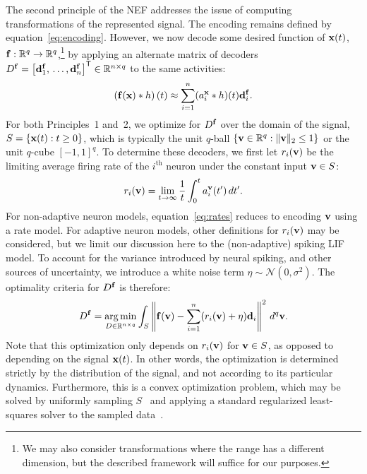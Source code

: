 The second principle of the NEF addresses the issue of computing transformations of the represented signal.
The encoding remains defined by equation~\ref{eq:encoding}.
However, we now decode some desired function of $\mathbf{x}(t)$, $\mathbf{f} : \mathbb{R}^q \rightarrow \mathbb{R}^q$,\footnote{
We may also consider transformations where the range has a different dimension, but the described framework will suffice for our purposes.}
by applying an alternate matrix of decoders $D^{\mathbf{f}} = {\left[ \mathbf{d}^{\mathbf{f}}_1\text{,}\, \ldots\text{,}\, \mathbf{d}^{\mathbf{f}}_n \right]}^\mathsf{T} \in \mathbb{R}^{n \times q}$ to the same activities:
\begin{equation} \label{eq:trans-decode}
\left( \mathbf{f}(\mathbf{x}) \ast h \right)(t) \approx \sum_{i=1}^n (a_i^{\mathbf{x}} \ast h)(t) \mathbf{d}^{\mathbf{f}}_i \text{.}
\end{equation}
For both Principles~1 and~2, we optimize for $D^{\mathbf{f}}$ over the domain of the signal, $S = \{\mathbf{x}(t) : t \ge 0\}$, which is typically the unit $q$-ball $\{ \mathbf{v} \in \mathbb{R}^q : \|\mathbf{v}\|_2 \le 1\}$ or the unit $q$-cube $[-1\text{,}\, 1]^q$.
To determine these decoders, we first let $r_i(\mathbf{v})$ be the limiting average firing rate of the $i^{\text{th}}$ neuron under the constant input $\mathbf{v} \in S$:
\begin{equation} \label{eq:rates}
r_i(\mathbf{v}) = \lim_{t \rightarrow \infty} \frac{1}{t} \int_{0}^t a_i^{\mathbf{v}}(t') \, dt' \text{.}
\end{equation}
For non-adaptive neuron models, equation~\ref{eq:rates} reduces to encoding $\mathbf{v}$ using a rate model.
For adaptive neuron models, other definitions for $r_i(\mathbf{v})$ may be considered, but we limit our discussion here to the (non-adaptive) spiking LIF model.
To account for the variance introduced by neural spiking, and other sources of uncertainty, we introduce a white noise term $\eta \sim \mathcal{N}(0, \sigma^2)$.
The optimality criteria for $D^{\mathbf{f}}$ is therefore:
\begin{equation} \label{eq:decoder_solution}
D^{\mathbf{f}} = \operatorname*{arg\,min}_{D \in \mathbb{R}^{n \times q}} \int_{S} \left\| \mathbf{f}(\mathbf{v}) - \sum_{i=1}^n (r_i(\mathbf{v}) + \eta) \mathbf{d}_i \right\|^2 \, d^q\mathbf{v} \text{.}
\end{equation}
Note that this optimization only depends on $r_i(\mathbf{v})$ for $\mathbf{v} \in S$, as opposed to depending on the signal $\mathbf{x}(t)$.
In other words, the optimization is determined strictly by the distribution of the signal, and not according to its particular dynamics.
Furthermore, this is a convex optimization problem, which may be solved by uniformly sampling $S$~\citep{voelker2017} and applying a standard regularized least-squares solver to the sampled data~\citep{bekolay2013}.
